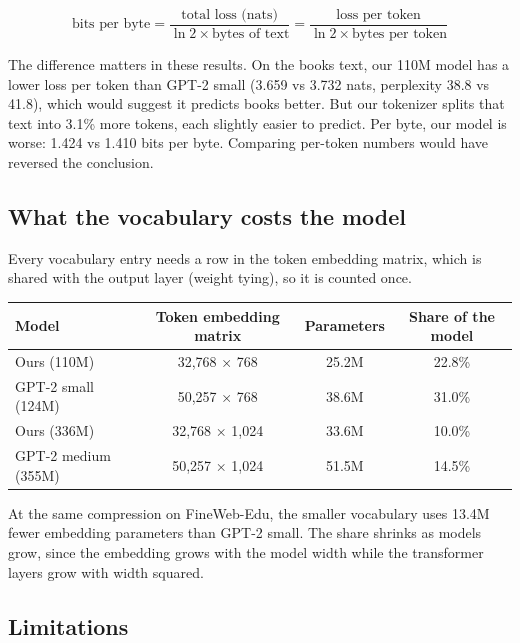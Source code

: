 \documentclass[11pt]{article}
\begin{document}
\begin{equation*}
\text{bits per byte} = \frac{\text{total loss (nats)}}{\ln 2 \times \text{bytes of text}} = \frac{\text{loss per token}}{\ln 2 \times \text{bytes per token}}
\end{equation*}

The difference matters in these results. On the books text, our 110M model has a lower loss per token than GPT-2 small (3.659 vs 3.732 nats, perplexity 38.8 vs 41.8), which would suggest it predicts books better. But our tokenizer splits that text into 3.1\% more tokens, each slightly easier to predict. Per byte, our model is worse: 1.424 vs 1.410 bits per byte. Comparing per-token numbers would have reversed the conclusion.

\subsection{What the vocabulary costs the model}

Every vocabulary entry needs a row in the token embedding matrix, which is shared with the output layer (weight tying), so it is counted once.

\begin{center}
\small
\begin{tabular}{lccc}
\toprule
\textbf{Model} & \textbf{Token embedding matrix} & \textbf{Parameters} & \textbf{Share of the model} \\
\midrule
Ours (110M) & 32,768 × 768 & 25.2M & 22.8\% \\
GPT-2 small (124M) & 50,257 × 768 & 38.6M & 31.0\% \\
Ours (336M) & 32,768 × 1,024 & 33.6M & 10.0\% \\
GPT-2 medium (355M) & 50,257 × 1,024 & 51.5M & 14.5\% \\
\bottomrule
\end{tabular}
\end{center}

At the same compression on FineWeb-Edu, the smaller vocabulary uses 13.4M fewer embedding parameters than GPT-2 small. The share shrinks as models grow, since the embedding grows with the model width while the transformer layers grow with width squared.

\subsection{Limitations}
\end{document}
